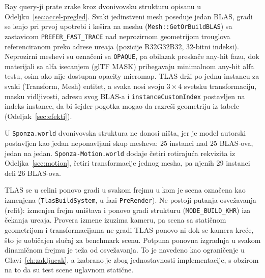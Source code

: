 Ray query-ji prate zrake kroz dvonivovsku strukturu opisanu u Odeljku~\ref{sec:accel-pregled}. Svaki jedinstveni mesh poseduje jedan BLAS, gradi se lenjo pri prvoj upotrebi i ke\v{s}ira na meshu (\texttt{Mesh::GetOrBuildBLAS}) sa zastavicom \texttt{PREFER_FAST_TRACE} nad neprozirnom geometrijom trouglova referenciranom preko adrese ure\dj{}aja (pozicije R32G32B32, 32-bitni indeksi). Neprozirni meshevi su ozna\v{c}eni sa \texttt{OPAQUE}, pa obilazak preska\v{c}e any-hit fazu, dok materijali sa alfa isecanjem (glTF MASK) pribegavaju minimalnom any-hit alfa testu, osim ako nije dostupan opacity micromap. TLAS dr\v{z}i po jednu instancu za svaki (Transform, Mesh) entitet, a svaka nosi svoju $3\times4$ svetsku transformaciju, masku vidljivosti, adresu svog BLAS-a i \texttt{instanceCustomIndex} postavljen na indeks instance, da bi \v{s}ejder pogotka mogao da razre\v{s}i geometriju iz tabele (Odeljak~\ref{sec:efekti}).

U \texttt{Sponza.world} dvonivovska struktura ne donosi ni\v{s}ta, jer je model autorski postavljen kao jedan neponavljani skup mesheva: 25 instanci nad 25 BLAS-ova, jedan na jedan. \texttt{Sponza-Motion.world} dodaje \v{c}etiri rotiraju\'ca rekvizita iz Odeljka~\ref{sec:motion}, \v{c}etiri transformacije jednog mesha, pa njenih 29 instanci deli 26 BLAS-ova.

TLAS se u celini ponovo gradi u svakom frejmu u kom je scena ozna\v{c}ena kao izmenjena (\texttt{TlasBuildSystem}, u fazi \texttt{PreRender}). Ne postoji putanja osve\v{z}avanja (refit): izmenjen frejm uni\v{s}tava i ponovo gradi strukturu (\texttt{MODE_BUILD_KHR}) iza \v{c}ekanja ure\dj{}aja. Provera izmene izuzima kameru, pa scena sa stati\v{c}nom geometrijom i transformacijama ne gradi TLAS ponovo ni dok se kamera kre\'ce, \v{s}to je uobi\v{c}ajen slu\v{c}aj za benchmark scenu. Potpuna ponovna izgradnja u svakom dinami\v{c}nom frejmu je te\v{z}a od osve\v{z}avanja. To je navedeno kao ograni\v{c}enje u Glavi~\ref{ch:zakljucak}, a izabrano je zbog jednostavnosti implementacije, s obzirom na to da su test scene uglavnom stati\v{c}ne.

